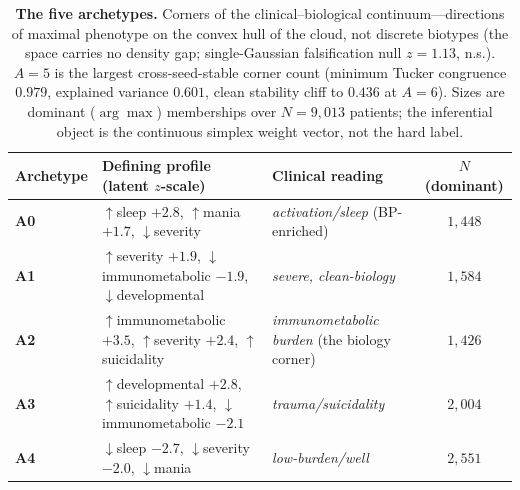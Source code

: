 \begin{table}[t]
\centering
\caption{\textbf{The five archetypes.} Corners of the clinical--biological
continuum---directions of maximal phenotype on the convex hull of the cloud, not
discrete biotypes (the space carries no density gap; single-Gaussian falsification null
$z=1.13$, n.s.). $A=5$ is the largest cross-seed-stable corner count (minimum Tucker
congruence $0.979$, explained variance $0.601$, clean stability cliff to $0.436$ at
$A=6$). Sizes are dominant ($\arg\max$) memberships over $N=9{,}013$ patients; the
inferential object is the continuous simplex weight vector, not the hard label.}
\label{tab:archetypes}
\small
\renewcommand{\arraystretch}{1.15}
\begin{tabular}{@{}l >{\raggedright\arraybackslash}p{4.5cm} >{\raggedright\arraybackslash}p{3.5cm} c@{}}
\toprule
Archetype & Defining profile (latent $z$-scale) & Clinical reading & $N$ (dominant) \\
\midrule
\textbf{A0} & $\uparrow$sleep $+2.8$, $\uparrow$mania $+1.7$, $\downarrow$severity & \emph{activation/sleep} (BP-enriched) & $1{,}448$ \\
\textbf{A1} & $\uparrow$severity $+1.9$, $\downarrow$immunometabolic $-1.9$, $\downarrow$developmental & \emph{severe, clean-biology} & $1{,}584$ \\
\textbf{A2} & $\uparrow$immunometabolic $+3.5$, $\uparrow$severity $+2.4$, $\uparrow$suicidality & \emph{immunometabolic burden} (the biology corner) & $1{,}426$ \\
\textbf{A3} & $\uparrow$developmental $+2.8$, $\uparrow$suicidality $+1.4$, $\downarrow$immunometabolic $-2.1$ & \emph{trauma/suicidality} & $2{,}004$ \\
\textbf{A4} & $\downarrow$sleep $-2.7$, $\downarrow$severity $-2.0$, $\downarrow$mania & \emph{low-burden/well} & $2{,}551$ \\
\bottomrule
\end{tabular}
\end{table}
